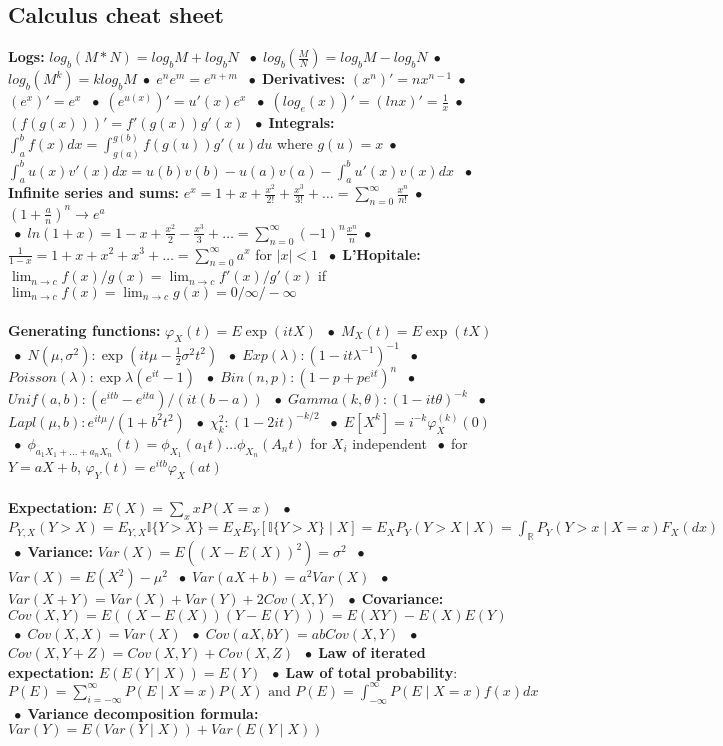\documentclass[9pt]{extarticle}
\newcommand{\abs}[1]{\lvert#1\rvert}
\newcommand*\bspace{$\; \bullet \;$}
\begin{document}
\subsection{Calculus cheat sheet}
\textbf{Logs:} $log_b(M * N) = log_bM + log_bN$ \bspace $log_b(\frac{M}{N}) = log_bM - log_bN$\bspace $log_b(M^k) = klog_bM$\bspace $e^ne^m = e^{n+m}$ \bspace \textbf{Derivatives:} $(x^n)' = nx^{n-1}$\bspace $(e^x)' = e^x$ \bspace $(e^{u(x)})' = u'(x)e^x$ \bspace $(log_e(x))' = (lnx)' = \frac{1}{x}$\bspace $(f(g(x)))' = f'(g(x))g'(x)$ \bspace \textbf{Integrals: } $\int_a^b f(x)dx = \int_{g(a)}^{g(b)}f(g(u))g'(u)du$ where $g(u) = x$\bspace $\int_a^b u(x)v'(x)dx = u(b)v(b) - u(a)v(a) - \int_a^b u'(x)v(x)dx$ \bspace \textbf{Infinite series and sums:} $e^x = 1 + x + \frac{x^2}{2!} + \frac{x^3}{3!} + \dots = \sum_{n=0}^\infty \frac{x^n}{n!}$\bspace $(1 + \frac{a}{n})^n \longrightarrow e^a$\\
\bspace $ln(1 + x) = 1 - x + \frac{x^2}{2} - \frac{x^3}{3} + \dots = \sum_{n=0}^\infty (-1)^n\frac{x^n}{n}$\bspace $\frac{1}{1-x} = 1 + x + x^2 + x^3 + \dots = \sum_{n=0}^\infty a^x$ for $\abs{x} < 1$ \bspace \textbf{L'Hopitale:} $\lim_{n\rightarrow c} f(x) / g(x) = \lim_{n\rightarrow c} f'(x)/g'(x)$ if $\lim_{n\rightarrow c} f(x) = \lim_{n\rightarrow c} g(x) = 0/\infty/-\infty$\\\\
\textbf{Generating functions:} $\varphi_X(t) = E \exp(itX)$ \bspace $M_X(t) = E\exp(tX)$ \bspace $N(\mu, \sigma^2): \exp(it\mu - \frac{1}{2}\sigma^2t^2)$ \bspace $Exp(\lambda): (1 - it\lambda ^{-1})^{-1}$ \bspace $Poisson(\lambda): \exp{\lambda(e^{it} - 1)}$ \bspace $Bin(n,p): (1 - p + pe^{it})^n$ \bspace $Unif(a,b): (e^{itb} - e^{ita})/ (it(b-a))$ \bspace $Gamma(k,\theta): (1 - it\theta)^{-k}$ \bspace $Lapl(\mu, b): e^{it\mu}/(1 + b^2t^2)$ \bspace $\chi^2_k: (1 - 2it)^{-k/2}$ \bspace $E[X^k] = i^{-k}\varphi_X^{(k)}(0)$ \bspace $\phi_{a_1X_1 + \dots + a_nX_n}(t) = \phi_{X_1}(a_1t) \dots \phi_{X_n}(A_nt)$ for $X_i$ independent \bspace for $Y = aX + b$, $\varphi_Y(t) = e^{itb}\varphi_X(at)$\\\\
\textbf{Expectation:} $E(X) = \sum_x xP(X=x)$ \bspace $P_{Y,X}(Y > X) = E_{Y,X}\mathbb{I}\{Y>X\} = E_XE_Y[\mathbb{I}\{Y>X\} \mid X] = E_XP_Y(Y > X \mid X) = \int_\mathbb{R}P_Y(Y > x \mid X = x)F_X(dx)$ \bspace \textbf{Variance: } $Var(X) = E((X - E(X))^2) = \sigma^2$ \bspace $Var(X) = E(X^2) - \mu^2$ \bspace $Var(aX+b) = a^2Var(X)$ \bspace $Var(X + Y) = Var(X) + Var(Y) + 2Cov(X, Y)$ \bspace \textbf{Covariance: } $Cov(X, Y) = E((X - E(X))(Y - E(Y))) = E(XY) - E(X)E(Y)$ \bspace $Cov(X, X) = Var(X)$ \bspace $Cov(aX, bY) = abCov(X, Y)$ \bspace $Cov(X, Y+Z) = Cov(X, Y) + Cov(X, Z)$ \bspace \textbf{Law of iterated expectation: } $E(E(Y\mid X)) = E(Y)$ \bspace \textbf{Law of total probability}: $P(E) = \sum_{i=-\infty}^\infty P(E \mid X = x)P(X) \textrm{ and } P(E) = \int_{-\infty}^\infty P(E \mid X=x)f(x)dx$ \bspace \textbf{Variance decomposition formula: } $Var(Y) = E(Var(Y\mid X)) + Var(E(Y \mid X))$\\\\
\end{document}
